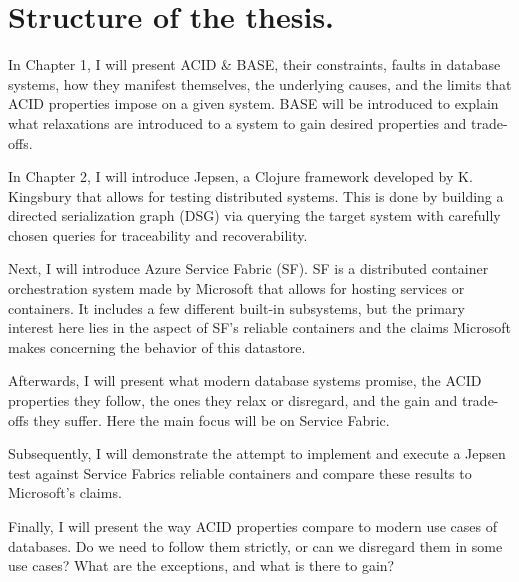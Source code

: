 \documentclass[a4paper,10pt,titlepage]{report}
\begin{document}
\section{Structure of the thesis.}

    In Chapter 1, I will present ACID \& BASE, their constraints, faults in database systems, how they manifest themselves, the underlying causes, and the limits that ACID properties impose on a given system. BASE will be introduced to explain what relaxations are introduced to a system to gain desired properties and trade-offs.\\
    \vspace{5mm}

    In Chapter 2, I will introduce Jepsen, a Clojure framework\cite{jepsonio} developed by K. Kingsbury that allows for testing distributed systems. This is done by building a directed serialization graph (DSG) via querying the target system with carefully chosen queries for traceability and recoverability.  \\
    \vspace{5mm}

    Next, I will introduce Azure Service Fabric (SF). SF is a distributed container orchestration system made by Microsoft that allows for hosting services or containers. It includes a few different built-in subsystems, but the primary interest here lies in the aspect of SF's reliable containers and the claims Microsoft makes concerning the behavior of this datastore.\\
    \vspace{5mm}

    Afterwards, I will present what modern database systems promise, the ACID properties they follow, the ones they relax or disregard, and the gain and trade-offs they suffer. Here the main focus will be on Service Fabric.\\
    \vspace{5mm}

    Subsequently,  I will demonstrate the attempt to implement and execute a Jepsen test against Service Fabrics reliable containers and compare these results to Microsoft's claims.\\
    \vspace{5mm}

    Finally, I will present the way ACID properties compare to modern use cases of databases. Do we need to follow them strictly, or can we disregard them in some use cases? What are the exceptions, and what is there to gain?\\
\end{document}
